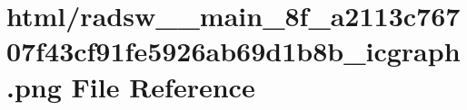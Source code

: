 \hypertarget{radsw____main__8f__a2113c76707f43cf91fe5926ab69d1b8b__icgraph_8png}{}\section{html/radsw\+\_\+\+\_\+main\+\_\+8f\+\_\+a2113c76707f43cf91fe5926ab69d1b8b\+\_\+icgraph.png File Reference}
\label{radsw____main__8f__a2113c76707f43cf91fe5926ab69d1b8b__icgraph_8png}
